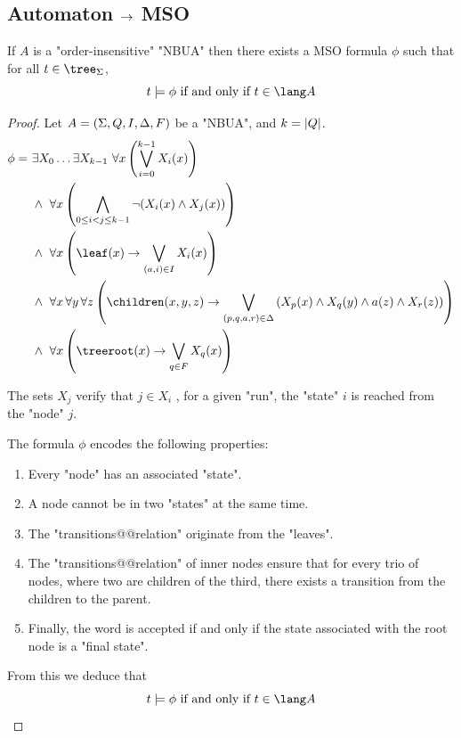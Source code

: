 \documentclass[twoside]{article}
\begin{document}
\subsection{Automaton $\rightarrow$ MSO}\label{sec:Aut-MSO}

\begin{lemma}
	If $A$ is a "order-insensitive" "NBUA"  then there exists a MSO formula $\phi$ such that for all $t \in \tree_{\Sigma}$,
	\[ t \models \phi \tiff t \in \lang A \]
\end{lemma}

\begin{proof}
	Let $A = (\Sigma, Q, I, \Delta, F)$ be a "NBUA", and $k = \left|Q\right|$.
	\begin{align}
		\phi =\  & \exists X_0 \ldots \exists X_{k-1} \ \forall x \left( \bigvee_{i=0}^{k-1} X_i(x) \right) \label{lem:AMSO1}                                                                                    \\
		         & \land\ \forall x \left( \bigwedge_{0 \leq i < j \leq k-1} \lnot (X_i(x) \land X_j(x)) \right) \label{lem:AMSO2}                                                                               \\
		         & \land\ \forall x \left( \leaf(x) \rightarrow \bigvee_{(a,i) \in I} X_i(x) \right) \label{lem:AMSO3}                                                                                           \\
		         & \land\ \forall x\, \forall y\, \forall z \left(\children(x,y,z) \rightarrow \bigvee_{(p,q,a,r) \in \Delta} \left(X_p(x) \land X_q(y) \land a(z) \land X_r(z)\right) \right) \label{lem:AMSO4} \\
		         & \land\ \forall x \left( \treeroot(x) \rightarrow \bigvee_{q \in F} X_q(x) \right) \label{lem:AMSO5}
	\end{align}

	The sets $X_j$ verify that $j \in X_i$ \tiff, for a given "run", the "state" $i$ is reached from the "node" $j$.

	The formula $\phi$ encodes the following properties:

	\begin{enumerate}
		\item Every "node" has an associated "state".
		\item A node cannot be in two "states" at the same time.
		\item The "transitions@@relation" originate from the "leaves".
		\item The "transitions@@relation" of inner nodes ensure that for every trio of nodes, where two are children of the third, there exists a transition from the children to the parent.
		\item Finally, the word is accepted if and only if the state associated with the root node is a "final state".
	\end{enumerate}

	From this we deduce that
	\[ t \models \phi \tiff t \in \lang A \]
\end{proof}
\end{document}
